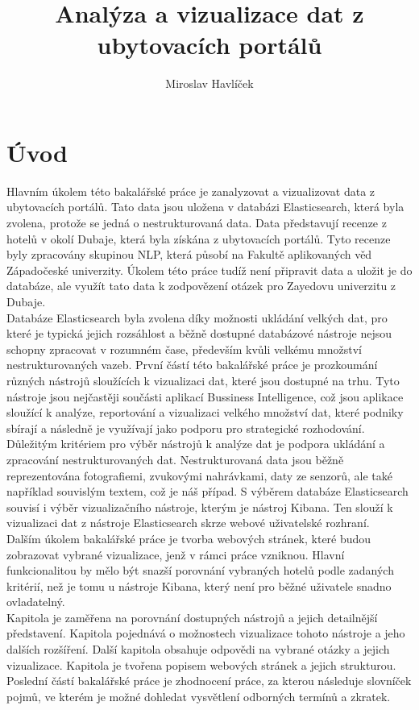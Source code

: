 \documentclass[czech,BP]{thesiskiv}
\author{Miroslav Havlíček}
\title{Analýza a vizualizace dat z ubytovacích portálů}
\begin{document}
%
\maketitle
\tableofcontents
\chapter{Úvod}
Hlavním úkolem této bakalářské práce je zanalyzovat a vizualizovat data z ubytovacích portálů. Tato data jsou uložena v databázi Elasticsearch, která byla zvolena, protože se jedná o nestrukturovaná data. Data představují recenze z hotelů v okolí Dubaje, která byla získána z ubytovacích portálů. Tyto recenze byly zpracovány skupinou NLP, která působí na Fakultě aplikovaných věd Západočeské univerzity. Úkolem této práce tudíž není připravit data a uložit je do databáze, ale využít tato data k zodpovězení otázek pro Zayedovu univerzitu z Dubaje.
\\
Databáze Elasticsearch byla zvolena díky možnosti ukládání velkých dat, pro které je typická jejich rozsáhlost a běžně dostupné databázové nástroje nejsou schopny zpracovat v rozumném čase, především kvůli velkému množství nestrukturovaných vazeb.\cite{BigData} První částí této bakalářské práce je prozkoumání různých nástrojů sloužících k vizualizaci dat, které jsou dostupné na trhu. Tyto nástroje jsou nejčastěji součásti aplikací Bussiness Intelligence, což jsou aplikace sloužící k analýze, reportování a vizualizaci velkého množství dat, které podniky sbírají a následně je využívají jako podporu pro strategické rozhodování. Důležitým kritériem pro výběr nástrojů k analýze dat je podpora ukládání a zpracování nestrukturovaných dat. Nestrukturovaná data jsou běžně reprezentována fotografiemi, zvukovými nahrávkami, daty ze senzorů, ale také například  souvislým textem, což je náš případ. S výběrem databáze Elasticsearch souvisí i výběr vizualizačního nástroje, kterým je nástroj Kibana. Ten slouží k vizualizaci dat z nástroje Elasticsearch skrze webové uživatelské rozhraní.
\\
Dalším úkolem bakalářské práce je tvorba webových stránek, které budou zobrazovat vybrané vizualizace, jenž v rámci práce vzniknou. Hlavní funkcionalitou by mělo být snazší porovnání vybraných hotelů podle zadaných kritérií, než je tomu u nástroje Kibana, který není pro běžné uživatele snadno ovladatelný.
\\
Kapitola  je zaměřena na porovnání dostupných nástrojů a jejich detailnější představení. Kapitola  pojednává o možnostech vizualizace tohoto nástroje a jeho dalších rozšíření. Další kapitola obsahuje odpovědi na vybrané otázky a jejich vizualizace. Kapitola  je tvořena popisem webových stránek a jejich strukturou. Poslední částí bakalářské práce je zhodnocení práce, za kterou následuje slovníček pojmů, ve kterém je možné dohledat vysvětlení odborných termínů a zkratek.
\end{document}
